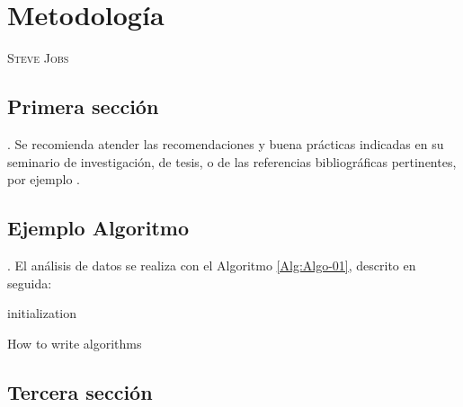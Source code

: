 \chapter{Metodología}
              {\textsc{Steve Jobs}}

\section{Primera sección}
\lipsum[1-2]. 
Se recomienda atender las recomendaciones y buena prácticas indicadas en su seminario de investigación, de tesis, o de
las referencias bibliográficas pertinentes, por ejemplo \cite{Sampieri}. 

\section{Ejemplo Algoritmo}
\lipsum[3]
\lipsum[4].
El análisis de datos se realiza con el Algoritmo \ref{Alg:Algo-01}, descrito en seguida:

\begin{algorithm}[H]
  \SetAlgoLined
  initialization\;
  \caption{How to write algorithms}
  \label{Alg:Algo-01}
\end{algorithm}

\section{Tercera sección}
\lipsum[5-6]

